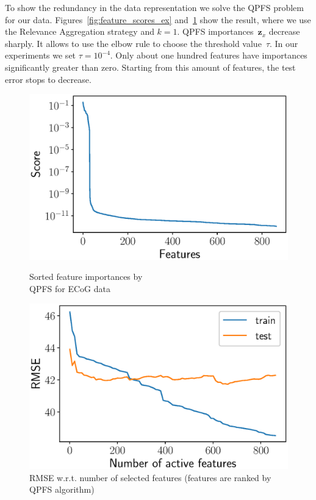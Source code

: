 \documentclass[12pt,oneside]{article}
\theoremstyle{definition}
\newcommand{\bz}{\mathbf{z}}
\begin{document}
To show the redundancy in the data representation we solve the QPFS problem for our data.
Figures~\ref{fig:feature_scores_ex} and~\ref{fig:train_test_qpfs} show the result, where we use the Relevance Aggregation strategy and $k = 1$.
QPFS importances~$\bz_x$ decrease sharply.
It allows to use the elbow rule to choose the threshold value~$\tau$. 
In our experiments we set $\tau = 10^{-4}$. 
Only about one hundred features have importances significantly greater than zero.
Starting from this amount of features, the test error stops to decrease.
\begin{figure}[h]
	\begin{minipage}{.5\linewidth}
		\centering
		\includegraphics[width=\linewidth]{figs/feature_scores_ex.eps}
		\caption{Sorted feature importances by \\ QPFS for ECoG data}
		\label{fig:feature_scores_ex}
	\end{minipage}%
	\begin{minipage}{.5\linewidth}
	\centering
	\includegraphics[width=\linewidth]{figs/train_test_qpfs.eps}
	\caption{RMSE w.r.t. number of selected features (features are ranked by QPFS algorithm)}
	\label{fig:train_test_qpfs}
	\end{minipage}
\end{figure}
\end{document}
